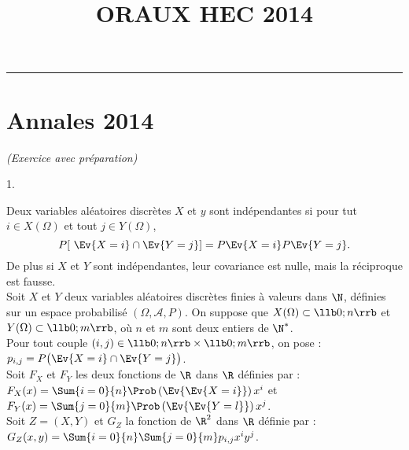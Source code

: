 \documentclass[11pt]{article}%
\title{\bf \vspace{-1cm} ORAUX HEC 2014} %
\author{} %
\date{} %
\begin{document}
\maketitle %
\vspace{-1.2cm}\hrule %
\thispagestyle{fancy}

\vspace*{.4cm}


\section{Annales 2014}


\begin{exercice}{\it (Exercice avec préparation)}~
  \begin{noliste}{1.}
    \setlength{\itemsep}{4mm}
  \item Deux variables aléatoires discrètes $X$ et $y$ sont
    indépendantes si pour tut $i \in X ( \Omega)$ et tout $j \in Y (
    \Omega )$,
    \[
    P [ \ \Ev{X = i} \cap \Ev{Y = j } ] = P \Ev{ X = i } P \Ev{ Y = j }.
    \]    
    De plus si $X$ et $Y$ sont indépendantes, leur covariance est
    nulle, mais la réciproque est fausse. \\
    Soit $X$ et $Y$ deux variables aléatoires discrètes finies à
    valeurs dans $\N$, définies sur un espace probabilisé $(\Omega,
    \mathcal{A}, P)$. On suppose que $ X ( \Omega ) \subset \llb 0 ; n
    \rrb$ et $Y ( \Omega ) \subset \llb 0 ; m \rrb$, où $n$ et $m$
    sont deux entiers de $\N^*$. \\
    Pour tout couple $(i,j) \in \llb 0 ; n \rrb \times \llb 0 ; m
    \rrb$, on pose : $p_{i,j} = P \big( \Ev{X = i} \cap \Ev{Y = j}
    \big)$.
    \\
    Soit $F_{X}$ et $F_{Y}$ les deux fonctions de $\R$ dans $\R$
    définies par : $F_{X} ( x) = \Sum{i = 0}{n} \Prob\left(\Ev{\Ev{X =
          i}}\right) x^{i} $ et $F_{Y} (x) =
    \Sum{j = 0}{m} \Prob\left(\Ev{\Ev{Y = l}}\right) x^{j}$. \\
    Soit $Z = (X,Y)$ et $G_{Z}$ la fonction de $\R^{2}$ dans $\R$
    définie par : $G_{Z} ( x, y ) = \Sum{i = 0}{n} \Sum{j = 0}{m}
    p_{i,j} x^{i} y^{j}$.
 

\end{noliste}
\end{exercice}
\end{document}
